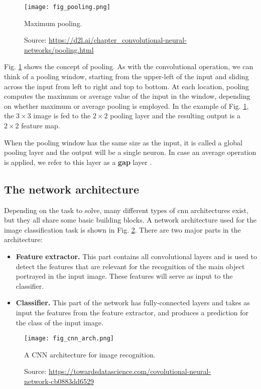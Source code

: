 \begin{figure}[ht]
    \begin{center}       
    \texttt{[image: fig\_pooling.png]}
    \caption[Maximum pooling]{Maximum pooling.}
    \caption*{Source: \href{https://d2l.ai/chapter\_convolutional-neural-networks/pooling.html}{https://d2l.ai/chapter\_convolutional-neural-networks/pooling.html}}
    \label{fig:pooling}
    \end{center}
\end{figure}

Fig. \ref{fig:pooling} shows the concept of pooling. As with the convolutional operation, we can think of a pooling window, starting from the upper-left of the input and sliding across the input from left to right and top to bottom. At each location, pooling computes the maximum or average value of the input in the window, depending on whether maximum or average pooling is employed. In the example of Fig. \ref{fig:pooling}, the $3 \times 3$ image is fed to the $2 \times 2$ pooling layer and the resulting output is a $2 \times 2$ feature map.

When the pooling window has the same size as the input, it is called a global pooling layer and the output will be a single neuron. In case an average operation is applied, we refer to this layer as a \textbf{\acrfull{gap}} layer \cite{lin2013network}.


\subsection{The network architecture}
Depending on the task to solve, many different types of \acrshort{cnn} architectures exist, but they all share some basic building blocks. A network architecture used for the image classification task is shown in Fig. \ref{fig:cnn_arch}. There are two major parts in the architecture:
\begin{itemize}
\item \textbf{Feature extractor.} This part contains all convolutional layers and is used to detect the features that are relevant for the recognition of the main object portrayed in the input image. These features will serve as input to the classifier.
\item \textbf{Classifier.} This part of the network has fully-connected layers and takes as input the features from the feature extractor, and produces a   prediction for the class of the input image.
\end{itemize}
\begin{figure}[ht]
    \begin{center}       
    \texttt{[image: fig\_cnn\_arch.png]}
    \caption[A CNN architecture for image recognition]{A CNN architecture for image recognition.}
    \caption*{Source: \href{https://towardsdatascience.com/covolutional-neural-network-cb0883dd6529}{https://towardsdatascience.com/covolutional-neural-network-cb0883dd6529}}
    \label{fig:cnn_arch}
    \end{center}
\end{figure}

